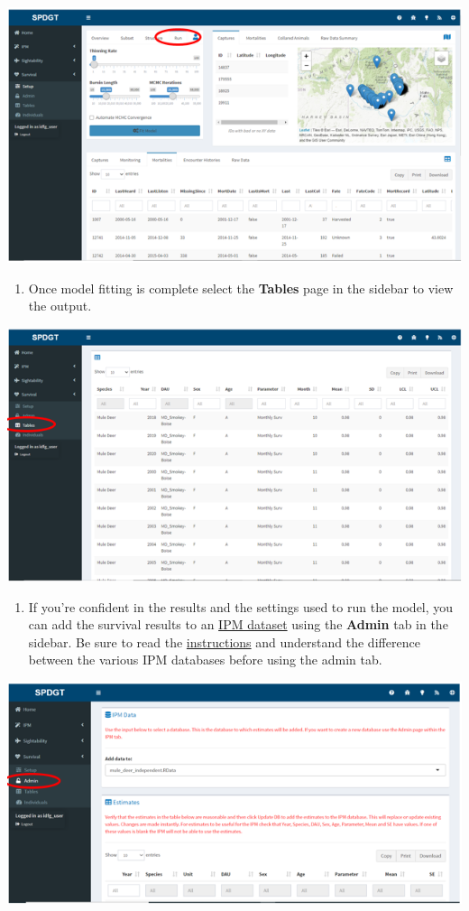\documentclass[
]{book}
\providecommand{\tightlist}{%
  \setlength{\itemsep}{0pt}\setlength{\parskip}{0pt}}
\begin{document}
\includegraphics{./www/surv_08.PNG}

\begin{enumerate}
\def\labelenumi{\arabic{enumi}.}
\setcounter{enumi}{8}
\tightlist
\item
  Once model fitting is complete select the \textbf{Tables} page in the sidebar to view the output.
\end{enumerate}

\includegraphics{./www/surv_10.PNG}

\begin{enumerate}
\def\labelenumi{\arabic{enumi}.}
\setcounter{enumi}{9}
\tightlist
\item
  If you're confident in the results and the settings used to run the model, you can add the survival results to an \protect\hyperlink{gl-ipm-db}{IPM dataset} using the \textbf{Admin} tab in the sidebar. Be sure to read the \protect\hyperlink{surv-admin}{instructions} and understand the difference between the various IPM databases before using the admin tab.
\end{enumerate}

\includegraphics{./www/surv_12.PNG}
\end{document}
